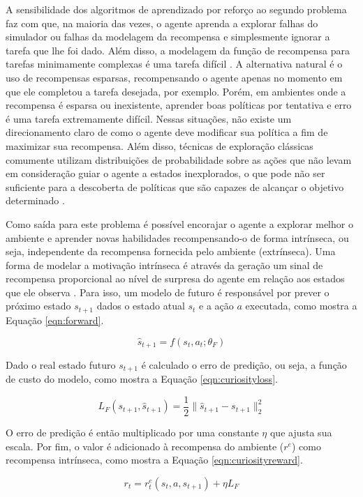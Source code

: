 A sensibilidade dos algoritmos de aprendizado por reforço ao segundo problema faz com que, na maioria das vezes, o agente aprenda a explorar falhas do simulador ou falhas da modelagem da recompensa e simplesmente ignorar a tarefa que lhe foi dado. Além disso, a modelagem da função de recompensa para tarefas minimamente complexas é uma tarefa difícil \cite{dexterity, ng, deepLoco}. A alternativa natural é o uso de recompensas esparsas, recompensando o agente apenas no momento em que ele completou a tarefa desejada, por exemplo. Porém, em ambientes onde a recompensa é esparsa ou inexistente, aprender boas políticas por tentativa e erro é uma tarefa extremamente difícil. Nessas situações, não existe um direcionamento claro de como o agente deve modificar sua política a fim de maximizar sua recompensa. Além disso, técnicas de exploração clássicas comumente utilizam distribuições de probabilidade sobre as ações que não levam em consideração guiar o agente a estados inexplorados, o que pode não ser suficiente para a descoberta de políticas que são capazes de alcançar o objetivo determinado \cite{pathak}.

Como saída para este problema é possível encorajar o agente a explorar melhor o ambiente e aprender novas habilidades recompensando-o de forma intrínseca, ou seja, independente da recompensa fornecida pelo ambiente (extrínseca). Uma forma de modelar a motivação intrínseca é através da geração um sinal de recompensa proporcional ao nível de surpresa do agente em relação aos estados que ele observa \cite{curiosityoriginal, pathak}. Para isso, um modelo de futuro é responsável por prever o próximo estado $s_{t+1}$ dados o estado atual $s_t$ e a ação $a$ executada, como mostra a Equação \ref{eqn:forward}.

\begin{equation}
\label{eqn:forward}
\hat{s}_{t+1} = f(s_t, a_t; \theta_F)
\end{equation}

Dado o real estado futuro $s_{t+1}$ é calculado o erro de predição, ou seja, a função de custo do modelo, como mostra a Equação \ref{eqn:curiosityloss}.

\begin{equation}
\label{eqn:curiosityloss}
L_F(s_{t+1}, \hat{s}_{t+1}) = \frac{1}{2}\|\hat{s}_{t+1} - s_{t+1}\|_2^2
\end{equation}

O erro de predição é então multiplicado por uma constante $\eta$ que ajusta sua escala. Por fim, o valor é adicionado à recompensa do ambiente ($r^e$) como recompensa intrínseca, como mostra a Equação \ref{eqn:curiosityreward}.

\begin{equation}
\label{eqn:curiosityreward}
r_t = r^e_t(s_t, a, s_{t+1}) + \eta L_F
\end{equation}
